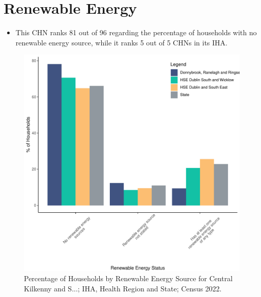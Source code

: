 \documentclass{article}
\begin{document}
\section{Renewable Energy}\label{sect:RE}
\begin{itemize}
\item This CHN ranks  81 out of 96 regarding the percentage of households with no renewable energy source, while it ranks   5 out of 5 CHNs in its IHA.
\end{itemize}
\begin{figure}[H]
	\centering
	\includegraphics[width = 140mm]{../figures/RenewableEnergyED.pdf}
	\caption{Percentage of Households by Renewable Energy Source for Central Kilkenny and S...; IHA, Health Region and State; Census 2022.}
	\label{fig:vbnv}
	\end{figure}
\end{document}
